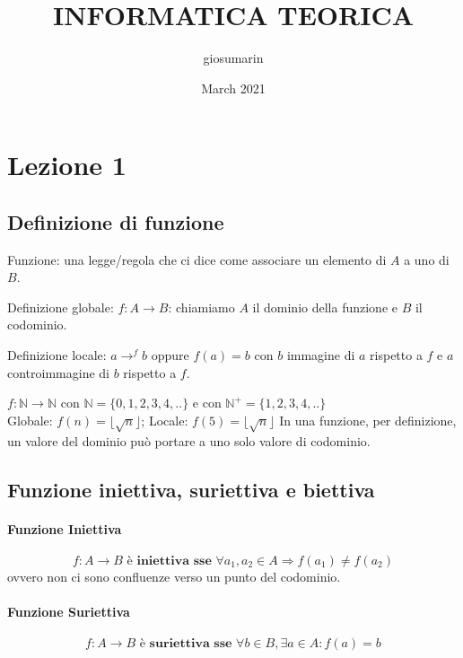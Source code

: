 \documentclass{article}
\title{INFORMATICA TEORICA}
\author{giosumarin}
\date{March 2021}
\begin{document}
\maketitle

\tableofcontents


\section{Lezione 1}
\subsection{Definizione di funzione}

Funzione: una legge/regola che ci dice come associare un elemento di $A$ a uno di $B$.


\noindent
Definizione globale: $f:A\rightarrow B$: chiamiamo $A$ il dominio della funzione e $B$ il codominio.


\noindent
Definizione locale: $a\rightarrow^f b$ oppure $f(a)=b$ con $b$ immagine di $a$ rispetto a $f$ e $a$ controimmagine di $b$ rispetto a $f$. 


\noindent
$f:\mathbb{N} \rightarrow \mathbb{N}$ con $\mathbb{N}=\{0,1,2,3,4,..\}$ e con $\mathbb{N}^+=\{1,2,3,4,..\}$
\\
Globale: $f(n)=\lfloor \sqrt{n} \rfloor$; Locale: $f(5)=\lfloor \sqrt{n} \rfloor$
In una funzione, per definizione, un valore del dominio può portare a uno solo valore di codominio.

\subsection{Funzione iniettiva, suriettiva e biettiva}
\paragraph{Funzione Iniettiva}
\begin{displaymath}\label{iniettiva}
f:A\rightarrow B \textbf{ è iniettiva sse } \forall a_1, a_2 \in A \Rightarrow f(a_1) \neq f(a_2)
\end{displaymath}
ovvero non ci sono confluenze verso un punto del codominio.

\paragraph{Funzione Suriettiva}
\begin{displaymath}\label{suriettiva}
f:A\rightarrow B \textbf{ è suriettiva sse } \forall b \in B,  \exists a \in A: f(a)=b
\end{displaymath}
\end{document}
